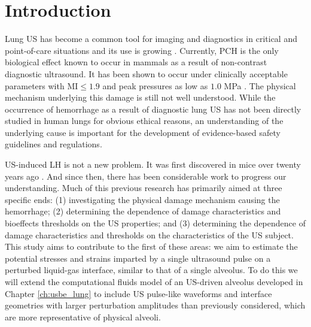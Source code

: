 \section{Introduction}
Lung \ac{US} has become a common tool for imaging and diagnostics in
critical and point-of-care situations and its use is growing
\citep{Lichtenstein2009}. Currently, \ac{PCH} is the only biological
effect known to occur in mammals as a result of non-contrast
diagnostic ultrasound. It has been shown to occur under clinically
acceptable parameters with \ac{MI}$\leq1.9$ \citep{FDA1997} and peak
pressures as low as $1.0$ MPa \citep{Dalecki1997}. The physical
mechanism underlying this damage is still not well understood. While
the occurrence of hemorrhage as a result of diagnostic lung \ac{US}
has not been directly studied in human lungs for obvious ethical
reasons, an understanding of the underlying cause is important for the
development of evidence-based safety guidelines and regulations.

\ac{US}-induced \ac{LH} is not a new problem. It was first discovered
in mice over twenty years ago \citep{Child1990}. And since then, there
has been considerable work to progress our understanding. Much of this
previous research has primarily aimed at three specific ends: (1)
investigating the physical damage mechanism causing the hemorrhage;
(2) determining the dependence of damage characteristics and
bioeffects thresholds on the \ac{US} properties; and (3) determining
the dependence of damage characteristics and thresholds on the
characteristics of the \ac{US} subject. This study aims to contribute
to the first of these areas: we aim to estimate the potential stresses
and strains imparted by a single ultrasound pulse on a perturbed
liquid-gas interface, similar to that of a single alveolus. To do this
we will extend the computational fluids model of an \ac{US}-driven
alveolus developed in Chapter \ref{ch:usbe_lung} to include \ac{US}
pulse-like waveforms and interface geometries with larger perturbation
amplitudes than previously considered, which are more representative
of physical alveoli.

